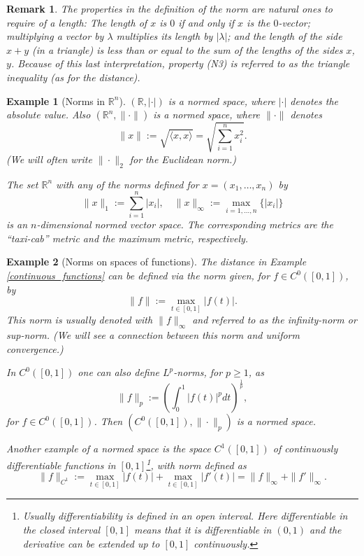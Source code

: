 \documentclass[a4paper,reqno]{amsart}
\numberwithin{equation}{section}
\newtheorem{remark}[definition]{Remark}
\newtheorem{example}{Example}
\def\R{\mathbb{R}}
\begin{document}
\begin{remark}
The properties in the definition of the norm are natural ones to require of a length: The length of $x$ is $0$ if and only if $x$ is the $0$-vector; multiplying a vector by $\lambda$ multiplies its length by $|\lambda|$; and the length of the side $x + y$ (in a triangle) is less than or equal to the sum of the lengths of the sides $x$, $y$. Because of this last interpretation, property (N3) is referred to as the triangle inequality (as for the distance).
\end{remark}

\begin{example}[Norms in $\R^n$]
$(\R,|\cdot|)$ is a normed space, where $|\cdot|$ denotes the absolute value. Also $(\R^n,\|\cdot\|)$ is a normed space, where $\|\cdot\|$ denotes
$$
\|x\|:= \sqrt{\langle x,x\rangle} = \sqrt{\sum_{i=1}^n x_i^2}.
$$
(We will often write $\|\cdot\|_2$ for the Euclidean norm.)

\medskip

The set $\R^n$ with any of the norms defined for $x = (x_1,\dots, x_n)$ by
$$
\|x\|_1 := \sum_{i=1}^n|x_i|, \quad \|x\|_{\infty} := \max_{i=1,\dots,n}\{ |x_i|\}
$$
is an $n$-dimensional normed vector space. The corresponding metrics are the ``taxi-cab'' metric and the maximum metric, respectively.

\end{example}

\begin{example}[Norms on spaces of functions]\label{continuous_functions-N}
The distance in Example \ref{continuous_functions} can be defined via the norm given, for $f \in C^0([0,1])$, by
$$
\|f\|:= \max_{t \in [0,1]} |f(t)|.
$$
This norm is usually denoted with $\|f\|_{\infty}$ and referred to as the infinity-norm or sup-norm. (We will see a connection between this norm and uniform convergence.)
\medskip

\noindent
In $C^0([0,1])$ one can also define $L^p$-norms, for $p\geq 1$, as
$$
\|f\|_p:= \left(\int_0^1|f(t)|^p dt\right)^{\frac1p},
$$
for $f\in C^0([0,1])$. Then $(C^0([0,1]), \|\cdot\|_p)$ is a normed space.

\medskip

Another example of a normed space is the space $C^1([0,1])$ of continuously differentiable functions in $[0,1]$\footnote{Usually differentiability is defined in an open interval. Here differentiable in the closed interval $[0,1]$ means that it is differentiable in $(0,1)$ and the derivative can be extended up to $[0,1]$ continuously.}, with norm defined as
$$
\|f\|_{C^1}:= \max_{t \in [0,1]} |f(t)| + \max_{t \in [0,1]} |f'(t)| = \|f\|_{\infty}+\|f'\|_{\infty}.
$$

\end{example}
\end{document}
